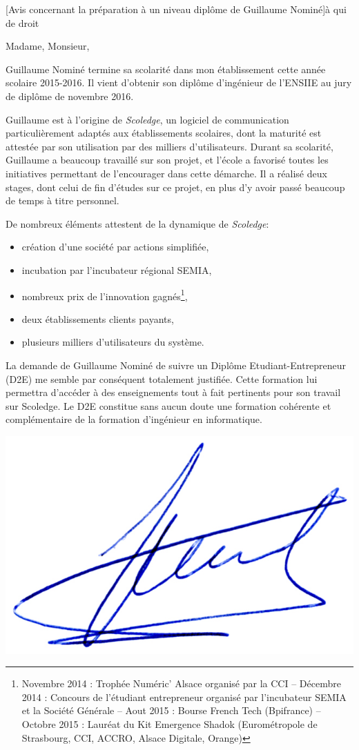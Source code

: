 \documentclass[a4paper,10pt]{article}
\begin{document}

\begin{letter}[Avis concernant la préparation à un niveau diplôme de Guillaume Nominé]{à}%
{qui de droit}


Madame, Monsieur,

Guillaume Nominé termine sa scolarité dans mon établissement cette année scolaire
2015-2016. Il vient d'obtenir son diplôme d'ingénieur de l'ENSIIE au jury de
diplôme de novembre 2016.

Guillaume est à l'origine de \textit{Scoledge}, un logiciel de communication particulièrement adaptés aux établissements scolaires,
dont la maturité est attestée par son utilisation par des milliers d'utilisateurs.
Durant sa scolarité, Guillaume a beaucoup travaillé sur son projet, et l'école a favorisé toutes les initiatives
permettant de l'encourager dans cette démarche.
Il a réalisé deux stages, dont celui de fin d'études sur ce projet, en plus 
d'y avoir passé beaucoup de temps à titre personnel.

De nombreux éléments attestent de la dynamique de \textit{Scoledge}:
\begin{itemize}
\item création d'une société par actions simplifiée,
\item incubation par l'incubateur régional SEMIA,
\item nombreux prix de l'innovation gagnés\footnote{Novembre 2014 : Trophée Numéric' Alsace organisé par la CCI
-- Décembre 2014 : Concours de l'étudiant entrepreneur organisé par l'incubateur SEMIA et la Société Générale
-- Aout 2015 : Bourse French Tech (Bpifrance)
-- Octobre 2015 : Lauréat du Kit Emergence Shadok (Eurométropole de Strasbourg, CCI, ACCRO, Alsace Digitale, Orange)}, 
\item deux établissements clients payants,
\item plusieurs milliers d'utilisateurs du système.
\end{itemize}


\vspace{.5cm}

La demande de Guillaume Nominé de suivre un Diplôme Etudiant-Entrepreneur (D2E) me
semble  par  conséquent  totalement  justifiée. Cette  formation  lui  permettra
d'accéder  à des  enseignements  tout à  fait pertinents  pour  son travail  sur
Scoledge.  Le  D2E  constitue  sans  aucun  doute  une  formation  cohérente  et
complémentaire de la formation d'ingénieur en informatique.





\end{letter}
\begin{flushright}
\includegraphics[width=.2\textwidth]{signgenaud.jpg}
\end{flushright}
\end{document}
